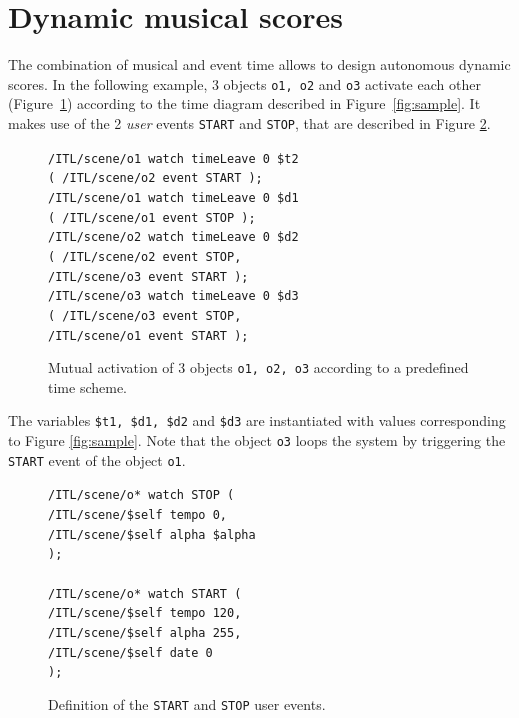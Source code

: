 \documentclass{article}
\newcommand{\OSC}[1]	{{\fontsize{8.5pt}{8pt} \selectfont\texttt{#1}}}
\newcommand{\tab}{\hspace*{4mm}}
\newcommand{\sample}[1]		{\vspace{-0.2em}\begin{center}\colorbox{mygrey}{\begin{minipage}[t]{0.98\columnwidth} {\small \texttt{#1}}\end{minipage}}\end{center}}
\begin{document}
\section{Dynamic musical scores}

The combination of musical and event time allows to design autonomous dynamic scores. In the following example, 3 objects \OSC{o1, o2} and \OSC{o3} activate each other
(Figure~\ref{fig:ex1}) according to the time diagram described in Figure~\ref{fig:sample}. It makes use of the 2 \emph{user} events \OSC{START} and \OSC{STOP}, that are described in Figure \ref{fig:ex2}.

\begin{figure}[h]
   \centering
\sample{/ITL/scene/o1 watch timeLeave 0 \$t2 \\
   \tab( /ITL/scene/o2 event START );\\
	/ITL/scene/o1 watch timeLeave 0 \$d1 \\
	\tab( /ITL/scene/o1 event STOP );\\
	/ITL/scene/o2 watch timeLeave 0 \$d2 \\
	\tab( /ITL/scene/o2 event STOP, \\
	\tab \tab/ITL/scene/o3 event START );\\
	/ITL/scene/o3 watch timeLeave 0 \$d3 \\
	\tab( /ITL/scene/o3 event STOP, \\
	\tab \tab/ITL/scene/o1 event START );
}
   \caption{Mutual activation of 3 objects \OSC{o1, o2, o3} according to a predefined time scheme.}
   \label{fig:ex1}
\end{figure}

The variables \OSC{\$t1, \$d1, \$d2} and \OSC{\$d3} are instantiated with values 
corresponding to Figure \ref{fig:sample}. Note that the object \OSC{o3} loops the system by triggering the \OSC{START} event of the object \OSC{o1}.

\begin{figure}[h]
   \centering
\sample{/ITL/scene/o* watch STOP ( \\
   \tab/ITL/scene/\$self tempo 0,\\
   \tab/ITL/scene/\$self alpha \$alpha	\\
);\\
\\
/ITL/scene/o* watch START ( \\
   \tab/ITL/scene/\$self tempo 120,\\
   \tab/ITL/scene/\$self alpha 255,\\
   \tab/ITL/scene/\$self date 0\\
);
}
   \caption{Definition of the \OSC{START} and \OSC{STOP} user events.}
   \label{fig:ex2}
\end{figure}
\end{document}
